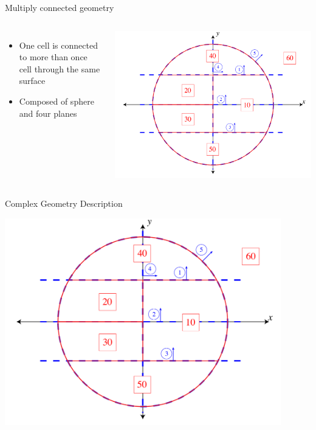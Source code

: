 \documentclass{beamer}
\begin{document}
\begin{frame}{Multiply connected geometry}
\begin{columns}[c]
\begin{itemize}
  \item One cell is connected to more than once cell through the same surface
  \item Composed of sphere and four planes
\end{itemize}

    \includegraphics[width=\textwidth, keepaspectratio]{test_geom_1}
\end{columns}
\end{frame}

\begin{frame}{Complex Geometry Description}
  \begin{center}
    \includegraphics[width=0.9\textwidth, keepaspectratio]{test_geom_1}
  \end{center}
\end{frame}
\end{document}
